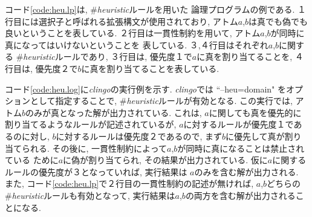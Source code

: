 コード\ref{code:heu.lp}は, \#\textit{heuristic}ルールを用いた
論理プログラムの例である. 
１行目には選択子と呼ばれる拡張構文が使用されており, 
アトム$a$,$b$は真でも偽でも良いということを表している. 
２行目は一貫性制約を用いて, 
アトム$a$,$b$が同時に真になってはいけないということを
表している.  
３,４行目はそれぞれ$a$,$b$に関する
\#\textit{heuristic}ルールであり, 
３行目は, 優先度１で$a$に真を割り当てることを, 
４行目は, 優先度２で$b$に真を割り当てることを表している. 

コード\ref{code:heu.log}に\textit{clingo}の実行例を示す. 
\textit{clingo}では ``--heu=domain" をオプションとして指定することで, 
\#\textit{heuristic}ルールが有効となる. 
この実行では, アトム$b$のみが真となった解が出力されている. 
これは, $a$に関しても真を優先的に割り当てるようなルールが記述されているが, 
$a$に対するルールが優先度１であるのに対し, $b$に対するルールは優先度２であるので, 
まず$b$に優先して真が割り当てられる. 
その後に, 一貫性制約によって$a$,$b$が同時に真になることは禁止されている
ために$a$に偽が割り当てられ, その結果が出力されている. 
仮に$a$に関するルールの優先度が３となっていれば, 実行結果は
$a$のみを含む解が出力される. 
また, コード\ref{code:heu.lp}で２行目の一貫性制約の記述が無ければ, 
$a$,$b$どちらの\#\textit{heuristic}ルールも有効となって, 
実行結果は$a$,$b$の両方を含む解が出力されることになる. 









